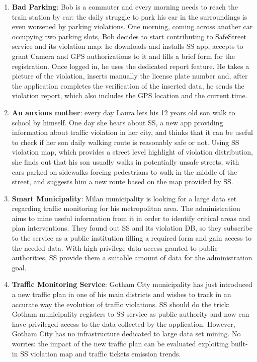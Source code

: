 	\begin{enumerate}
	\item \textbf{Bad Parking}: Bob is a commuter and every morning needs to reach the train station by car: the daily struggle to park his car in the surroundings is even worsened by parking violations. One morning, coming across another car occupying two parking slots, Bob decides to start contributing to SafeStreet service and its violation map: he downloads and installs SS app, accepts to grant Camera and GPS authorizations to it and fills a brief form for the registration. Once logged in, he uses the dedicated report feature. He takes a picture of the violation, inserts manually the license plate number and, after the application completes the verification of the inserted data, he sends the violation report, which also includes the GPS location and the current time.
 \item \textbf{An anxious mother}: every day Laura lets his 12 years old son walk to school by himself. One day she hears about SS, a new app providing information about traffic violation in her city, and thinks that it can be useful to check if her son daily walking route is reasonably safe or not. Using SS violation map, which provides a street level highlight of violation distribution, she finds out that his son usually walks in potentially unsafe streets, with cars parked on sidewalks forcing pedestrians to walk in the middle of the street, and suggests him a new route based on the map provided by SS.
\item \textbf{Smart Municipality}: Milan municipality is looking for a large data set regarding traffic monitoring for his metropolitan area. The administration aims to mine useful information from it in order to identify critical areas and plan interventions. They found out SS and its violation DB, so they subscribe to the service as a public institution filling a required form and gain access to the needed data. With high privilege data access granted to public authorities, SS provide them a suitable amount of data for the administration goal.
\item \textbf{Traffic Monitoring Service}: Gotham City municipality has just introduced a new traffic plan in one of his main districts and wishes to track in an accurate way the evolution of traffic violations. SS should do the trick: Gotham municipality registers to SS service as public authority and now can have privileged access to the data collected by the application. However, Gotham City has no infrastructure dedicated to large data set mining. No worries: the impact of the new traffic plan can be evaluated exploiting built-in SS violation map and traffic tickets emission trends.

\end{enumerate}
